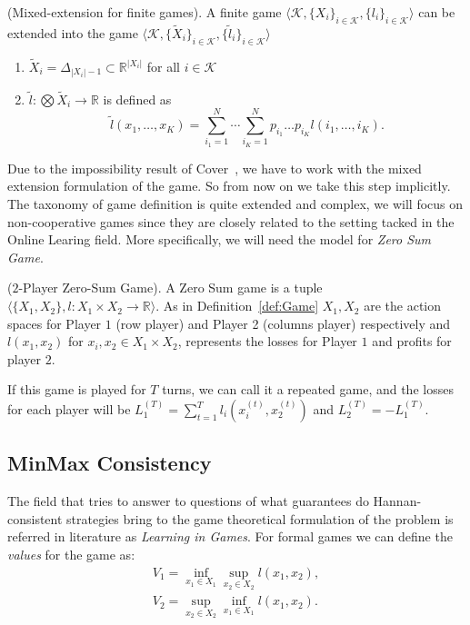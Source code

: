 \begin{definition}(Mixed-extension for finite games).
A finite game $\langle\mathcal K,\{X_i\}_{i\in\mathcal K},\{l_i\}_{i\in\mathcal K}\rangle$ can be extended into the game $\langle\mathcal K,\{\tilde X_i\}_{i\in\mathcal K},\{\tilde l_i\}_{i\in\mathcal K}\rangle$
\begin{enumerate}
	\item $\tilde X_i=\Delta_{|X_i|-1}\subset \mathbb R^{|X_i|}$ for all $i\in\mathcal K$ 
	\item $\tilde l:\bigotimes \tilde X_i\to\mathbb R$ is defined as
	$$\tilde l(x_1,\ldots,x_K)=\sum\limits_{i_1=1}^N\cdots\sum\limits_{i_K=1}^Np_{i_1}\ldots p_{i_K}l(i_1,\ldots,i_K).$$ 
\end{enumerate}
\end{definition}

Due to the impossibility result of Cover~\cite{cover1966behavior}, we have to work with the mixed extension formulation of the game. So from now on we take this step implicitly.
The taxonomy of game definition is quite extended and complex, we will focus on non-cooperative games \cite{nash1951non} since they are closely related to the setting tacked in the Online Learing field. More specifically, we will need the model for \emph{Zero Sum Game}. 

\begin{definition}($2$-Player Zero-Sum Game).\label{def:ZSG}
A Zero Sum game is a tuple $\langle\{X_1,X_2\},l:X_1\times X_2\to\mathbb R\rangle$. As in Definition~\ref{def:Game} $X_1,X_2$ are the action spaces for Player $1$ (row player) and Player 2 (columns player) respectively and $l(x_1,x_2)$ for $x_i,x_2\in X_1\times X_2$, represents the losses for Player $1$ and profits for player $2$.
\end{definition}

If this game is played for $T$ turns, we can call it a repeated game, and the losses for each player will be $L_1^{(T)}=\sum\limits_{t=1}^Tl_i\left(x_i^{(t)},x_2^{(t)}\right)$ and $L_2^{(T)}=-L_1^{(T)}$. 


\subsection{MinMax Consistency}
The field that tries to answer to questions of what guarantees do Hannan-consistent strategies bring to the game theoretical formulation of the problem is referred in literature as \emph{Learning in Games}.
For formal games we can define the \emph{values} for the game as: 
\begin{align}
    V_1=\inf\limits_{x_1\in X_1}\sup\limits_{x_2\in X_2}l(x_1,x_2),\\
	V_2=\sup\limits_{x_2\in X_2}\inf\limits_{x_1\in X_1}l(x_1,x_2).
\end{align}

